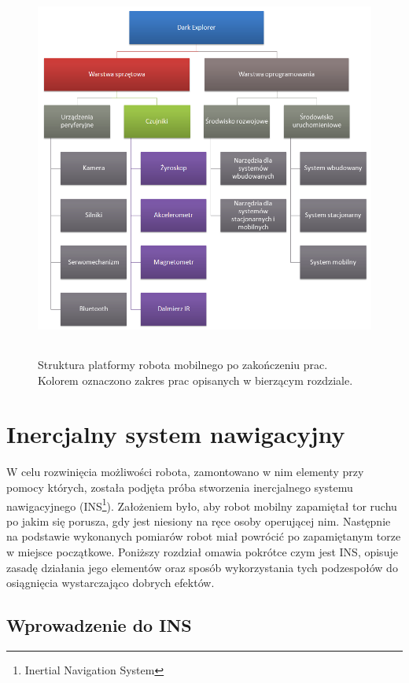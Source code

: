 \begin{figure}[!ht]
 \centering
 \includegraphics[height=125mm]{../images/ch04/dark_explorer_platform_hardware.png}
 \caption{Struktura platformy robota mobilnego po zakończeniu prac. Kolorem oznaczono zakres prac opisanych w bierzącym rozdziale.}
 \label{fig:DarkExplorerPlatformHardware}
\end{figure}

\section{Inercjalny system nawigacyjny}
W celu rozwinięcia możliwości robota, zamontowano w nim elementy przy pomocy
których, została podjęta próba stworzenia inercjalnego systemu nawigacyjnego
(INS\footnote{Inertial Navigation System}). Założeniem było, aby robot mobilny
zapamiętał tor ruchu po jakim się porusza, gdy jest niesiony na ręce
osoby operującej nim. Następnie na podstawie wykonanych pomiarów robot miał
powrócić po zapamiętanym torze w miejsce początkowe. Poniższy rozdział omawia
pokrótce czym jest INS, opisuje zasadę działania jego elementów oraz sposób
wykorzystania tych podzespołów do osiągnięcia wystarczająco dobrych efektów.

\subsection{Wprowadzenie do INS}


